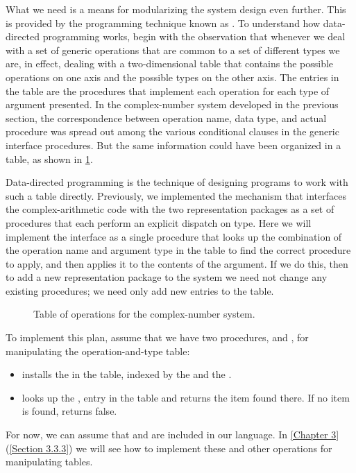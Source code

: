 What we need is a means for modularizing the system design even further.
This is provided by the programming technique known as .
To understand how data-directed programming works, begin with the observation that whenever we deal with a set of generic operations that are common to a set of different types we are, in effect, dealing with a two-dimensional table that contains the possible operations on one axis and the possible types on the other axis.
The entries in the table are the procedures that implement each operation for each type of argument presented.
In the complex-number system developed in the previous section, the correspondence between operation name, data type, and actual procedure was spread out among the various conditional clauses in the generic interface procedures.
But the same information could have been organized in a table, as shown in \cref{Figure 2.22}.

Data-directed programming is the technique of designing programs to work with such a table directly.
Previously, we implemented the mechanism that interfaces the complex-arithmetic code with the two representation packages as a set of procedures that each perform an explicit dispatch on type.
Here we will implement the interface as a single procedure that looks up the combination of the operation name and argument type in the table to find the correct procedure to apply, and then applies it to the contents of the argument.
If we do this, then to add a new representation package to the system we need not change any existing procedures;
we need only add new entries to the table.

\begin{figure}[tb]
	\centering
	
	\caption{
		Table of operations for the complex-number system.
	}
	\label{Figure 2.22}
\end{figure}

To implement this plan, assume that we have two procedures,  and
, for manipulating the operation-and-type table:
\begin{itemize}

	\item
		 installs the  in the table, indexed by the  and the .

	\item
		 looks up the ,  entry in the table and returns the item found there.
		If no item is found,  returns false.

\end{itemize}
For now, we can assume that  and  are included in our language.
In \cref{Chapter 3} (\cref{Section 3.3.3}) we will see how to implement these and other operations for manipulating tables.

